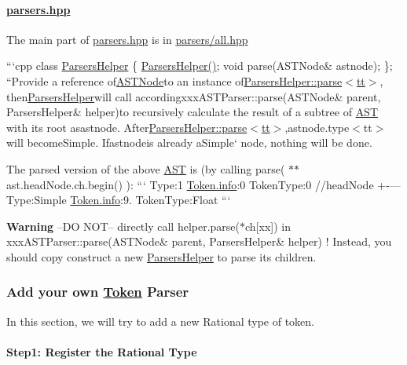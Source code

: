 \paragraph*{\hyperlink{parsers_8hpp}{parsers.\+hpp}}

The main part of {\ttfamily \hyperlink{parsers_8hpp}{parsers.\+hpp}} is in {\ttfamily \hyperlink{parsers_2all_8hpp}{parsers/all.\+hpp}}

```cpp class \hyperlink{class_parsers_helper}{Parsers\+Helper} \{ \hyperlink{class_parsers_helper}{Parsers\+Helper()}; void parse(\+A\+S\+T\+Node\& astnode); \}; ``{\ttfamily  Provide a reference of}\hyperlink{struct_a_s_t_node}{A\+S\+T\+Node}{\ttfamily to an instance of}\hyperlink{class_parsers_helper_a21ce6213ee29e0459dd655c6803db00b}{Parsers\+Helper\+::parse$<$tt$>$}, then\hyperlink{class_parsers_helper}{Parsers\+Helper}{\ttfamily will call according}xxx\+A\+S\+T\+Parser\+::parse(\+A\+S\+T\+Node\& parent, Parsers\+Helper\& helper){\ttfamily to recursively calculate the result of a subtree of \hyperlink{class_a_s_t}{A\+S\+T} with its root as}astnode{\ttfamily . After}\hyperlink{class_parsers_helper_a21ce6213ee29e0459dd655c6803db00b}{Parsers\+Helper\+::parse$<$tt$>$},astnode.\+type$<$tt$>$will becomeSimple{\ttfamily . If}astnode{\ttfamily is already a}Simple` node, nothing will be done.

The parsed version of the above \hyperlink{class_a_s_t}{A\+S\+T} is (by calling {\ttfamily parse( $\ast$$\ast$ast.head\+Node.\+ch.\+begin() )}\+: ``` Type\+:1 \hyperlink{struct_token_a4c338f6ca199f4a8575e877d36d03a06}{Token.\+info}\+:0 Token\+Type\+:0 //head\+Node +-\/---Type\+:Simple \hyperlink{struct_token_a4c338f6ca199f4a8575e877d36d03a06}{Token.\+info}\+:9. Token\+Type\+:Float ```

{\bfseries Warning} --D\+O N\+O\+T-- directly call {\ttfamily helper.\+parse($\ast$ch\mbox{[}xx\mbox{]})} in {\ttfamily xxx\+A\+S\+T\+Parser\+::parse(\+A\+S\+T\+Node\& parent, Parsers\+Helper\& helper)} ! Instead, you should copy construct a new {\ttfamily \hyperlink{class_parsers_helper}{Parsers\+Helper}} to parse its children.

\subsubsection*{Add your own \hyperlink{struct_token}{Token} Parser}

In this section, we will try to add a new {\ttfamily Rational} type of token.

\paragraph*{Step1\+: Register the Rational Type}

